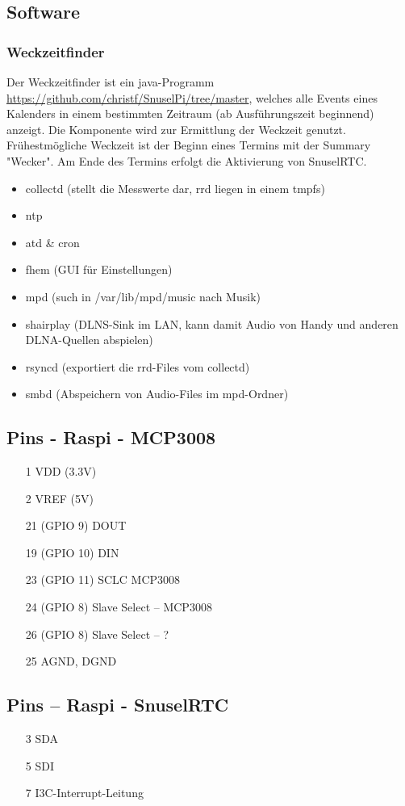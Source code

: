 \documentclass[a4paper,twoside,titlepage,normalheadings,tocleft,bibtotoc]{scrartcl}
\begin{document}
\subsection{Software}
\subsubsection{Weckzeitfinder}

Der Weckzeitfinder ist ein java-Programm
\url{https://github.com/christf/SnuselPi/tree/master}, welches alle Events
eines Kalenders in einem bestimmten Zeitraum (ab Ausführungszeit beginnend)
anzeigt. Die Komponente wird zur Ermittlung der Weckzeit genutzt.
Frühestmögliche Weckzeit ist der Beginn eines Termins mit der Summary "Wecker".
Am Ende des Termins erfolgt die Aktivierung von SnuselRTC.

\begin{itemize}
\item collectd (stellt die Messwerte dar, rrd liegen in einem tmpfs)
\item ntp
\item atd \& cron
\item fhem (GUI für Einstellungen)
\item mpd (such in /var/lib/mpd/music nach Musik)
\item shairplay (DLNS-Sink im LAN, kann damit Audio von Handy und anderen DLNA-Quellen abspielen)
\item rsyncd (exportiert die rrd-Files vom collectd)
\item smbd (Abspeichern von Audio-Files im mpd-Ordner)
\end{itemize}

\subsection{Pins - Raspi - MCP3008}
\begin{itemize}
\item[1] VDD (3.3V)
\item[2] VREF (5V)
\item[21] (GPIO 9) DOUT
\item[19] (GPIO 10) DIN
\item[23] (GPIO 11) SCLC MCP3008
\item[24] (GPIO 8) Slave Select -- MCP3008
\item[26] (GPIO 8) Slave Select -- ?
\item[25] AGND, DGND
\end{itemize}

\subsection{Pins -- Raspi - SnuselRTC}
\begin{itemize}
\item[3] SDA
\item[5] SDI
\item[7] I3C-Interrupt-Leitung
\end{itemize}
\end{document}
